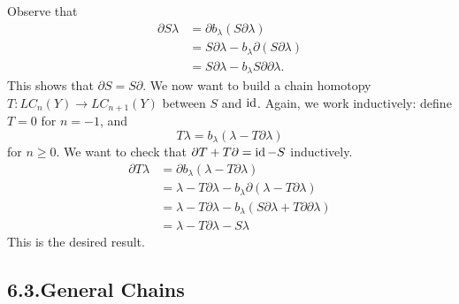 \documentclass{article}
\begin{document}
Observe that%
\noindent\noindent\[%
\begin{aligned}
\partial S \lambda &= \partial b_\lambda (S \partial \lambda) \\
&= S \partial \lambda - b_\lambda \partial (S \partial \lambda) \\
&= S \partial \lambda - b_\lambda S \partial \partial \lambda.
\end{aligned}
\]%
\noindent{}This shows that $\partial S = S \partial$. We now want to build a chain homotopy $T: LC_n(Y) \to LC_{n+1}(Y)$ between $S$ and $\operatorname{id}$. Again, we work inductively: define $T = 0$ for $n=-1$, and
\noindent\noindent\[%
T\lambda = b_\lambda(\lambda - T\partial\lambda)
\]%
\noindent{}for $n \ge 0$. We want to check that $\partial T + T \partial = \operatorname{id} - S$ inductively.
\noindent\noindent\[%
\begin{aligned}
\partial T \lambda &= \partial b_\lambda (\lambda - T \partial \lambda) \\
&= \lambda - T\partial\lambda - b_\lambda \partial(\lambda - T\partial\lambda) \\
&= \lambda - T\partial\lambda - b_\lambda (S\partial\lambda + T\partial\partial\lambda) \\
&= \lambda - T\partial\lambda - S\lambda 
\end{aligned}
\]%
\noindent{}This is the desired result.

\subsection{6.3.\hspace*{0.5em}General Chains}\label{sec-general-chains}%
\end{document}
